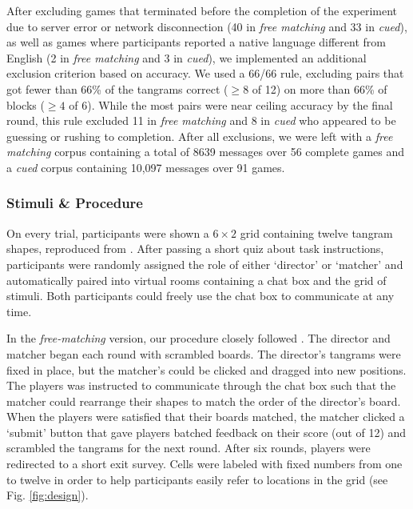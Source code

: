 After excluding games that terminated before the completion of the experiment due to server error or network disconnection (40 in \emph{free matching} and 33 in \emph{cued}), as well as games where participants reported a native language different from English (2 in \emph{free matching} and 3 in \emph{cued}), we implemented an additional exclusion criterion based on accuracy. 
We used a 66/66 rule, excluding pairs that got fewer than 66\% of the tangrams correct ($\ge8$ of 12) on more than 66\% of blocks ($\ge4$ of 6). 
While the most pairs were near ceiling accuracy by the final round, this rule excluded 11 in \emph{free matching} and 8 in \emph{cued} who appeared to be guessing or rushing to completion. 
After all exclusions, we were left with a \emph{free matching} corpus containing a total of 8639 messages over 56 complete games and a \emph{cued} corpus containing 10,097 messages over 91 games.

\subsubsection{Stimuli \& Procedure}\label{stimuli}

On every trial, participants were shown a \(6 \times 2\) grid containing twelve tangram shapes, reproduced from \cite{ClarkWilkesGibbs86_ReferringCollaborative}.  
After passing a short quiz about task instructions, participants were randomly assigned the role of either `director' or `matcher' and automatically paired into virtual rooms containing a chat box and the grid of stimuli. 
Both participants could freely use the chat box to communicate at any time. 

In the \emph{free-matching} version, our procedure closely followed \cite{ClarkWilkesGibbs86_ReferringCollaborative}. 
The director and matcher began each round with scrambled boards. 
The director's tangrams were fixed in place, but the matcher's could be clicked and dragged into new positions.
The players was instructed to communicate through the chat box such that the matcher could rearrange their shapes to match the order of the director's board.
When the players were satisfied that their boards matched, the matcher clicked a `submit' button that gave players batched feedback on their score (out of 12) and scrambled the tangrams for the next round. 
After six rounds, players were redirected to a short exit survey. 
Cells were labeled with fixed numbers from one to twelve in order to help participants easily refer to locations in the grid (see Fig. \ref{fig:design}).

